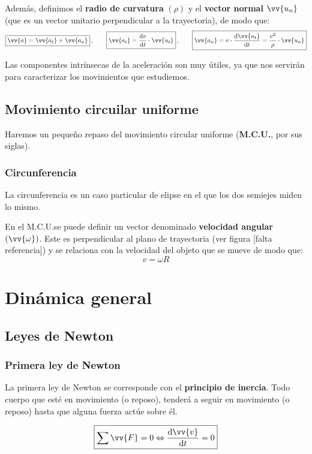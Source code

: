 \documentclass[a4paper]{book}
\numberwithin{figure}{chapter}
\numberwithin{equation}{chapter}
\renewcommand{\vec}[1]{\vv{{#1}}}
\newcommand{\mcu}{M.C.U.}
\begin{document}
Además, definimos el \textbf{radio de curvatura} $(\rho )$ y el \textbf{vector normal} $\vec{u_n}\, $ (que es un vector unitario perpendicular a la trayectoria), de modo que:
\[\boxed{\vec{a} = \vec{a_t} + \vec{a_n}} \, , \qquad
	\boxed{\vec{a_t} = \dv{v}{t}\cdot \vec{u_t}}\, , \qquad
	\boxed{\vec{a_n} = v\cdot \dv{\vec{u_t}}{t} = \frac{v^2}{\rho}\cdot \vec{u_n} }\]

Las componentes intrínsecas de la aceleración son muy útiles, ya que nos servirán para caracterizar los movimientos que estudiemos.

\subsection{Movimiento circuilar uniforme}
Haremos un pequeño repaso del movimiento circular uniforme (\textbf{\mcu}, por sus siglas).

\subsubsection{Circunferencia}
La circunferencia es un caso particular de elipse en el que los dos semiejes miden lo mismo.

En el \mcu\space se puede definir un vector denominado \textbf{velocidad angular} $(\vec{\omega})$. Este es perpendicular al plano de trayectoria (ver figura [falta referencia]) y se relaciona con la velocidad del objeto que se mueve de modo que:
\[v=\omega R\]

\section{Dinámica general}
\subsection{Leyes de Newton}
\subsubsection{Primera ley de Newton}
La primera ley de Newton se corresponde con el \textbf{principio de inercia}. Todo cuerpo que esté en movimiento (o reposo), tenderá a seguir en movimiento (o reposo) hasta que alguna fuerza actúe sobre él.

\begin{equation} \label{eq:primera_ley_Newton}
	\boxed{\sum{\vec{F}} = 0 \Leftrightarrow \dv{\vec{v}}{t} = 0}
\end{equation}
\end{document}
